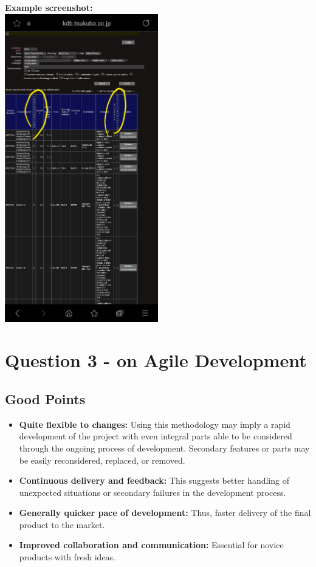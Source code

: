 \documentclass[12pt,a4paper]{article}
\begin{document}
\textbf{Example screenshot:} \\ 
\includegraphics[width=0.5\textwidth]{materials/KDB1.jpg}

\section{Question 3 - on Agile Development}

\subsection{Good Points}
\begin{itemize}
    \item \textbf{Quite flexible to changes:} Using this methodology may imply a rapid development of the project with even integral parts able to be considered through the ongoing process of development. Secondary features or parts may be easily reconsidered, replaced, or removed.
    \item \textbf{Continuous delivery and feedback:} This suggests better handling of unexpected situations or secondary failures in the development process.
    \item \textbf{Generally quicker pace of development:} Thus, faster delivery of the final product to the market.
    \item \textbf{Improved collaboration and communication:} Essential for novice products with fresh ideas.
\end{itemize}
\end{document}
